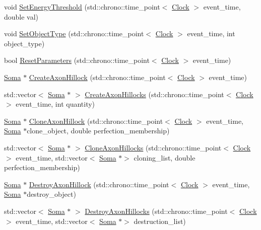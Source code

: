 \begin{DoxyCompactItemize}
\item 
void \hyperlink{class_soma_ae2876b37909f37e8922ce364eb06491f}{Set\+Energy\+Threshold} (std\+::chrono\+::time\+\_\+point$<$ \hyperlink{universe_8h_a0ef8d951d1ca5ab3cfaf7ab4c7a6fd80}{Clock} $>$ event\+\_\+time, double val)
\item 
void \hyperlink{class_soma_a85b4708eb51ab0962a6128b87aff0700}{Set\+Object\+Type} (std\+::chrono\+::time\+\_\+point$<$ \hyperlink{universe_8h_a0ef8d951d1ca5ab3cfaf7ab4c7a6fd80}{Clock} $>$ event\+\_\+time, int object\+\_\+type)
\item 
bool \hyperlink{class_soma_a82f016dc126f7d1053e5eb455d28c44b}{Reset\+Parameters} (std\+::chrono\+::time\+\_\+point$<$ \hyperlink{universe_8h_a0ef8d951d1ca5ab3cfaf7ab4c7a6fd80}{Clock} $>$ event\+\_\+time)
\item 
\hyperlink{class_soma}{Soma} $\ast$ \hyperlink{class_soma_a42289635de3cb326bceeb5358b99c190}{Create\+Axon\+Hillock} (std\+::chrono\+::time\+\_\+point$<$ \hyperlink{universe_8h_a0ef8d951d1ca5ab3cfaf7ab4c7a6fd80}{Clock} $>$ event\+\_\+time)
\item 
std\+::vector$<$ \hyperlink{class_soma}{Soma} $\ast$ $>$ \hyperlink{class_soma_ab059a6d4a7dc41664d6d17794d09b260}{Create\+Axon\+Hillocks} (std\+::chrono\+::time\+\_\+point$<$ \hyperlink{universe_8h_a0ef8d951d1ca5ab3cfaf7ab4c7a6fd80}{Clock} $>$ event\+\_\+time, int quantity)
\item 
\hyperlink{class_soma}{Soma} $\ast$ \hyperlink{class_soma_a31463fba2f535e9c7cb05c8622fe3562}{Clone\+Axon\+Hillock} (std\+::chrono\+::time\+\_\+point$<$ \hyperlink{universe_8h_a0ef8d951d1ca5ab3cfaf7ab4c7a6fd80}{Clock} $>$ event\+\_\+time, \hyperlink{class_soma}{Soma} $\ast$clone\+\_\+object, double perfection\+\_\+membership)
\item 
std\+::vector$<$ \hyperlink{class_soma}{Soma} $\ast$ $>$ \hyperlink{class_soma_a299c95b89f50576244d1e56f531a80be}{Clone\+Axon\+Hillocks} (std\+::chrono\+::time\+\_\+point$<$ \hyperlink{universe_8h_a0ef8d951d1ca5ab3cfaf7ab4c7a6fd80}{Clock} $>$ event\+\_\+time, std\+::vector$<$ \hyperlink{class_soma}{Soma} $\ast$$>$ cloning\+\_\+list, double perfection\+\_\+membership)
\item 
\hyperlink{class_soma}{Soma} $\ast$ \hyperlink{class_soma_af6d6d3e3c94f06682cf05a7a72032a46}{Destroy\+Axon\+Hillock} (std\+::chrono\+::time\+\_\+point$<$ \hyperlink{universe_8h_a0ef8d951d1ca5ab3cfaf7ab4c7a6fd80}{Clock} $>$ event\+\_\+time, \hyperlink{class_soma}{Soma} $\ast$destroy\+\_\+object)
\item 
std\+::vector$<$ \hyperlink{class_soma}{Soma} $\ast$ $>$ \hyperlink{class_soma_a5220929442601962af1a1fad66a8c919}{Destroy\+Axon\+Hillocks} (std\+::chrono\+::time\+\_\+point$<$ \hyperlink{universe_8h_a0ef8d951d1ca5ab3cfaf7ab4c7a6fd80}{Clock} $>$ event\+\_\+time, std\+::vector$<$ \hyperlink{class_soma}{Soma} $\ast$$>$ destruction\+\_\+list)

\end{DoxyCompactItemize}
